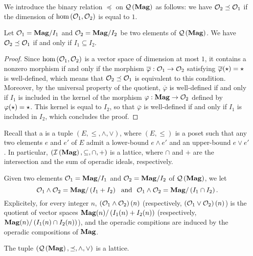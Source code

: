 We introduce the binary relation $\preceq$ on $\mathcal{Q}\left(\mathbf{Mag}\right)$ as follows: we
have $\mathcal{O}_2\preceq\mathcal{O}_1$ if the dimension of
$\text{hom}\left(\mathcal{O}_1,\mathcal{O}_2\right)$ is equal to $1$.

\begin{Proposition} \label{prop:order_relations_on_QMag_and_ideals}
  Let $\mathcal{O}_1=\mathbf{Mag}/I_1$ and $\mathcal{O}_2=\mathbf{Mag}/I_2$ be two elements of $\mathcal{Q}\left(\mathbf{Mag}\right)$.
  We have $\mathcal{O}_2\preceq\mathcal{O}_1$ if and only if $I_1\subseteq I_2$.
\end{Proposition}

\begin{proof}
  Since $\text{hom}\left(\mathcal{O}_1,\mathcal{O}_2\right)$ is a vector space of
  dimension at most $1$, it contains a nonzero morphism if and only if
  the morphism
  $\overline{\varphi}:\mathcal{O}_1\to\mathcal{O}_2$ satisfying
  $\overline{\varphi}(\operatorname{\star})=\operatorname{\star}$ is well-defined, which means
  that $\mathcal{O}_2\preceq\mathcal{O}_1$ is equivalent to this condition. Moreover,
  by the universal property of the quotient, $\overline{\varphi}$ is
  well-defined if and only if $I_1$ is included in the kernel of the
  morphism $\varphi:\mathbf{Mag}\to\mathcal{O}_2$ defined by
  $\varphi(\operatorname{\star})=\operatorname{\star}$. This kernel is equal to $I_2$, so that
  $\overline{\varphi}$ is well-defined if and only if $I_1$ is included
  in $I_2$, which concludes the proof.
\end{proof}

Recall that a  is a tuple $\left(E,\leq,\wedge,\vee\right)$,
where $\left(E,\leq\right)$ is a poset such that any two elements $e$
and $e'$ of $E$ admit a lower-bound $e\wedge e'$ and an upper-bound
$e\vee e'$. In particular, $\left(\mathcal{I}\left(\mathbf{Mag}\right),\subseteq,\cap,+\right)$ is a
lattice, where $\cap$ and $+$ are the intersection and the sum of
operadic ideals, respectively.

Given two elements $\mathcal{O}_1=\mathbf{Mag}/I_1$ and $\mathcal{O}_2=\mathbf{Mag}/I_2$ of $\mathcal{Q}\left(\mathbf{Mag}\right)$,
we let
\begin{equation} \label{equ:definition_of_lattice_operations_of_QMag}
  \mathcal{O}_1\wedge \mathcal{O}_2=\mathbf{Mag}/\left(I_1+I_2\right)\ \ \text{and}\ \
  \mathcal{O}_1\wedge \mathcal{O}_2=\mathbf{Mag}/\left(I_1\cap I_2\right).
\end{equation}
Explicitely, for every integer $n$, $\left(\mathcal{O}_1\wedge\mathcal{O}_2\right)(n)$ (respectively, $\left(\mathcal{O}_1\vee\mathcal{O}_2\right)(n)$) is the quotient of vector spaces $\mathbf{Mag}(n)/\left(I_1(n)+I_2(n)\right)$ (respectively, $\mathbf{Mag}(n)/\left(I_1(n)\cap I_2(n)\right)$), and the operadic compitions are induced by the operadic compositions of $\mathbf{Mag}$.

\begin{Theorem} \label{thm:lattice_structure_of_QMag}
  The tuple $\left(\mathcal{Q}\left(\mathbf{Mag}\right),\preceq,\wedge,\vee\right)$ is a lattice.
\end{Theorem}

